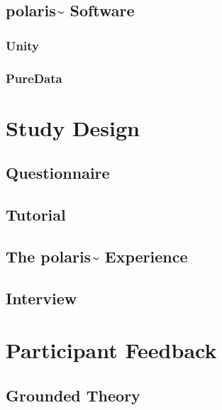 \subsection{polaris\textasciitilde{} Software}\label{sec: polaris-framework-software}
\subsubsection{Unity}\label{sec: polaris-framework-software-unity}
\subsubsection{PureData}\label{sec: polaris-framework-software-puredata}



\section{Study Design}\label{sec: polaris-study}
\subsection{Questionnaire}\label{sec: polaris-study-questionnaire}

\subsection{Tutorial}\label{sec: polaris-study-tutorial}

\subsection{The polaris\textasciitilde{} Experience}\label{sec: polaris-study-experience}

\subsection{Interview}\label{sec: polaris-study-interview}



\section{Participant Feedback}\label{sec: polaris-feedback}
\subsection{Grounded Theory}\label{sec: polaris-feedback-grounded}


